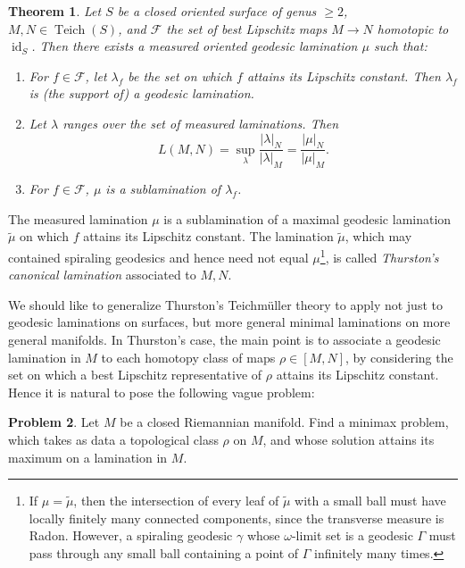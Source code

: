 \documentclass[reqno,11pt]{amsart}
\DeclareMathOperator{\id}{id}
\DeclareMathOperator{\Teich}{Teich}
\newcommand{\dfn}[1]{\emph{#1}\index{#1}}
\newtheorem{theorem}{Theorem}[section]
\theoremstyle{definition}
\newtheorem{problem}[theorem]{Problem}
\numberwithin{equation}{section}
\begin{document}
\begin{theorem}\label{existence of Thurston lamination}
Let $S$ be a closed oriented surface of genus $\geq 2$, $M, N \in \Teich(S)$, and $\mathcal F$ the set of best Lipschitz maps $M \to N$ homotopic to $\id_S$.
Then there exists a measured oriented geodesic lamination $\mu$ such that:
\begin{enumerate}
\item For $f \in \mathcal F$, let $\lambda_f$ be the set on which $f$ attains its Lipschitz constant. Then $\lambda_f$ is (the support of) a geodesic lamination.
\item Let $\lambda$ ranges over the set of measured laminations. Then
\begin{equation}\label{L is K}
L(M, N) = \sup_\lambda \frac{|\lambda|_N}{|\lambda|_M} = \frac{|\mu|_N}{|\mu|_M}.
\end{equation}
\item For $f \in \mathcal F$, $\mu$ is a sublamination of $\lambda_f$.
\end{enumerate}
\end{theorem}

The measured lamination $\mu$ is a sublamination of a maximal geodesic lamination $\tilde \mu$ on which $f$ attains its Lipschitz constant.
The lamination $\tilde \mu$, which may contained spiraling geodesics and hence need not equal $\mu$\footnote{If $\mu = \tilde \mu$, then the intersection of every leaf of $\tilde \mu$ with a small ball must have locally finitely many connected components, since the transverse measure is Radon. However, a spiraling geodesic $\gamma$ whose $\omega$-limit set is a geodesic $\Gamma$ must pass through any small ball containing a point of $\Gamma$ infinitely many times.}, is called \dfn{Thurston's canonical lamination} associated to $M, N$.

We should like to generalize Thurston's Teichm\"uller theory to apply not just to geodesic laminations on surfaces, but more general minimal laminations on more general manifolds.
In Thurston's case, the main point is to associate a geodesic lamination in $M$ to each homotopy class of maps $\rho \in [M, N]$, by considering the set on which a best Lipschitz representative of $\rho$ attains its Lipschitz constant.
Hence it is natural to pose the following vague problem:

\begin{problem}
	Let $M$ be a closed Riemannian manifold.
	Find a minimax problem, which takes as data a topological class $\rho$ on $M$, and whose solution attains its maximum on a lamination in $M$.
\end{problem}
\end{document}
